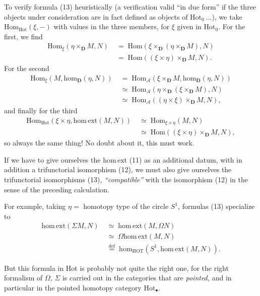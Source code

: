 \documentclass[11pt]{article}
\newcommand{\printedpage}[1]{\marginpar{\footnotesize p.~#1}}
\newcommand{\msp}[1]{\marginpar{\footnotesize [#1]}}
\newcommand{\D}{\mathbf{D}}
\newcommand{\Hot}{\mathrm{Hot}}
\newcommand{\Hom}{\mathrm{Hom}}
\newcommand{\hm}{\mathrm{hom}}
\newcommand{\homext}{\mathrm{hom}\,\mathrm{ext}}
\newcommand{\HOT}{\mathrm{HOT}}
\newcommand{\defeq}{\overset{\text{def}}{=}}
\begin{document}
To verify formula (13) heuristically (a verification valid ``in due form'' if the three objects under consideration are in fact defined as objects of $\Hot_0\ \ldots$), we take $\Hom_{\Hot}(\xi,-)$ with values in the three members, for $\xi$ given in $\Hot_0$. For the first, we find
\[
\begin{aligned}
\Hom_{\xi}(\eta\times_{\D}M,N) &\;=\;\Hom(\xi\times_{\D}(\eta\times_{\D}M),N)\\
&\;=\;\Hom((\xi\times\eta)\times_{\D}M,N).
\end{aligned}
\]
For the second
\[
\begin{aligned}
\Hom_{\xi}(M,\hm_{\D}(\eta,N)) &\;=\;\Hom_{\mathcal{A}}(\xi\times_{\D}M,\hm_{\D}(\eta,N))\\
&\;\simeq\;\Hom_{\mathcal{A}}(\eta\times_{\D}(\xi\times_{\D}M),N)\\
&\;\simeq\;\Hom_{\mathcal{A}}((\eta\times\xi)\times_{\D}M,N),
\end{aligned}
\]
\msp{page 10}
and finally for the third
\[
\begin{aligned}
\Hom_{\Hot}(\xi\times\eta,\homext(M,N)) &\;\simeq\;\Hom_{\xi\times\eta}(M,N)\\
&\;\simeq\;\Hom((\xi\times\eta)\times_{\D}M,N),
\end{aligned}
\]
so always the same thing! No doubt about it, this must work.

If we have to give ourselves the $\homext$ (11) as an additional datum, with in addition a trifunctorial isomorphism (12), we must also give ourselves the trifunctorial isomorphisms (13), \textit{``compatible''} with the isomorphism (12) in the sense of the preceding calculation.

\printedpage{7}

For example, taking $\eta=$ homotopy type of the circle $S^1$, formulas (13) specialize to
\[
\begin{aligned}
\homext(\Sigma M,N) &\;\simeq\;\homext(M,\Omega N)\\
&\;\simeq\;\Omega\homext(M,N)\\
&\;\defeq\;\hm_{\HOT}(S^1,\homext(M,N)).
\end{aligned}
\tag*{(14)}
\]

But this formula in Hot is probably not quite the right one, for the right formalism of $\Omega$, $\Sigma$ is carried out in the categories that are \textit{pointed,} and in particular in the pointed homotopy category $\Hot_{\bullet}$. %
\end{document}
